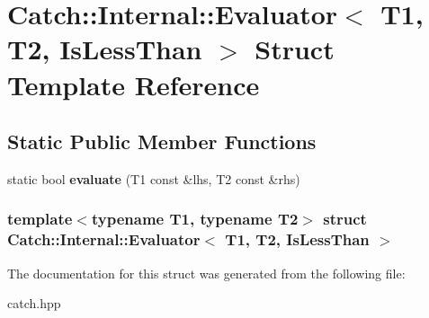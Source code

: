 \hypertarget{structCatch_1_1Internal_1_1Evaluator_3_01T1_00_01T2_00_01IsLessThan_01_4}{
\section{Catch::Internal::Evaluator$<$ T1, T2, IsLessThan $>$ Struct Template Reference}
\label{structCatch_1_1Internal_1_1Evaluator_3_01T1_00_01T2_00_01IsLessThan_01_4}
}
\subsection*{Static Public Member Functions}
\begin{DoxyCompactItemize}
\item 
\hypertarget{structCatch_1_1Internal_1_1Evaluator_3_01T1_00_01T2_00_01IsLessThan_01_4_a75b2bcf80ce6f90218c145e2c3293d75}{
static bool {\bfseries evaluate} (T1 const \&lhs, T2 const \&rhs)}
\label{structCatch_1_1Internal_1_1Evaluator_3_01T1_00_01T2_00_01IsLessThan_01_4_a75b2bcf80ce6f90218c145e2c3293d75}

\end{DoxyCompactItemize}
\subsubsection*{template$<$typename T1, typename T2$>$ struct Catch::Internal::Evaluator$<$ T1, T2, IsLessThan $>$}



The documentation for this struct was generated from the following file:\begin{DoxyCompactItemize}
\item 
catch.hpp\end{DoxyCompactItemize}
